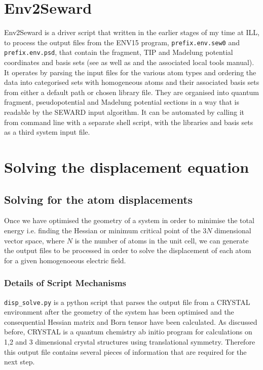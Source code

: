 \documentclass[10pt]{article}
\begin{document}
\section{Env2Seward}
Env2Seward is a driver script that written in the earlier stages of my time at ILL, to process the output files from the ENV15 program, \texttt{prefix.env.sew0} and \texttt{prefix.env.psd}, that contain the fragment, TIP and Madelung potential coordinates and basis sets (see \cite{varignon2013ab} as well as \cite{gelle2008fast} and the associated local tools manual). It operates by parsing the input files for the various atom types and ordering the data into categorised sets with homogeneous atoms and their associated basis sets from either a default path or chosen library file. They are organised into quantum fragment, pseudopotential and Madelung potential sections in a way that is readable by the SEWARD input algorithm. It can be automated by calling it from command line with a separate shell script, with the libraries and basis sets as a third system input file. 

\section{Solving the displacement equation}
\subsection{Solving for the atom displacements}

Once we have optimised the geometry of a system in order to minimise the total energy i.e. finding the Hessian or minimum critical point of the $3N$ dimensional vector space, where $N$ is the number of atoms in the unit cell, we can generate the output files to be processed in order to solve the displacement of each atom for a given homogenoeous electric field.  


\subsubsection{Details of Script Mechanisms}

\texttt{disp\_solve.py} is a python script that parses the output file from a CRYSTAL environment after the geometry of the system has been optimised and the consequential Hessian matrix and Born tensor have been calculated. As discussed before, CRYSTAL is a quantum chemistry ab initio program for calculations on 1,2 and 3 dimensional crystal structures using translational symmetry. Therefore this output file contains several pieces of information that are required for the next step. 
\end{document}
